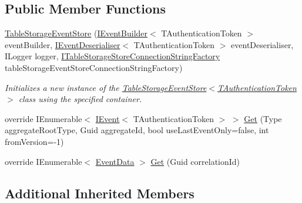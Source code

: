 \subsection*{Public Member Functions}
\begin{DoxyCompactItemize}
\item 
\hyperlink{classCqrs_1_1Azure_1_1Storage_1_1Events_1_1TableStorageEventStore_af9497418dd323ce2a9d8615ebc7da054_af9497418dd323ce2a9d8615ebc7da054}{Table\+Storage\+Event\+Store} (\hyperlink{interfaceCqrs_1_1Events_1_1IEventBuilder}{I\+Event\+Builder}$<$ T\+Authentication\+Token $>$ event\+Builder, \hyperlink{interfaceCqrs_1_1Events_1_1IEventDeserialiser}{I\+Event\+Deserialiser}$<$ T\+Authentication\+Token $>$ event\+Deserialiser, I\+Logger logger, \hyperlink{interfaceCqrs_1_1Azure_1_1BlobStorage_1_1ITableStorageStoreConnectionStringFactory}{I\+Table\+Storage\+Store\+Connection\+String\+Factory} table\+Storage\+Event\+Store\+Connection\+String\+Factory)
\begin{DoxyCompactList}\small\item\em Initializes a new instance of the \hyperlink{classCqrs_1_1Azure_1_1Storage_1_1Events_1_1TableStorageEventStore_af9497418dd323ce2a9d8615ebc7da054_af9497418dd323ce2a9d8615ebc7da054}{Table\+Storage\+Event\+Store$<$\+T\+Authentication\+Token$>$} class using the specified container. \end{DoxyCompactList}\item 
override I\+Enumerable$<$ \hyperlink{interfaceCqrs_1_1Events_1_1IEvent}{I\+Event}$<$ T\+Authentication\+Token $>$ $>$ \hyperlink{classCqrs_1_1Azure_1_1Storage_1_1Events_1_1TableStorageEventStore_a089514182da7a70f35f9237c521c49f0_a089514182da7a70f35f9237c521c49f0}{Get} (Type aggregate\+Root\+Type, Guid aggregate\+Id, bool use\+Last\+Event\+Only=false, int from\+Version=-\/1)
\item 
override I\+Enumerable$<$ \hyperlink{classCqrs_1_1Events_1_1EventData}{Event\+Data} $>$ \hyperlink{classCqrs_1_1Azure_1_1Storage_1_1Events_1_1TableStorageEventStore_a1b436bbb111b14b85ee6ba7f90fb1a35_a1b436bbb111b14b85ee6ba7f90fb1a35}{Get} (Guid correlation\+Id)
\end{DoxyCompactItemize}
\subsection*{Additional Inherited Members}


